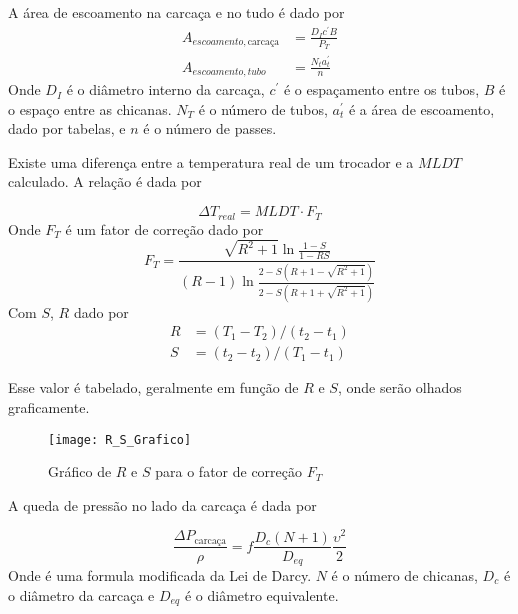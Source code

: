A área de escoamento na carcaça e no tudo é dado por 
\begin{align}
    A_{escoamento, \text{carcaça}} &= \frac{D_{I} c^{\prime} B}{P_{T} }\label{eq:area_escoamento_carcaça}\\
    A_{escoamento, tubo} &= \frac{N_{t} a_t ^{\prime} }{n}\label{eq:area_escoamento_tubo}
\end{align}
Onde \(D_{I}\) é o diâmetro interno da carcaça, \(c^{\prime}\) é o espaçamento entre os tubos,
\(B\) é o espaço entre as chicanas. \(N_{T} \) é o número de tubos, \(a_{t}^{\prime}\) é a área de
escoamento, dado por tabelas, e \(n\) é o número de passes. \par

Existe uma diferença entre a temperatura real de um trocador e a \(MLDT\) calculado. A relação é
dada por

\begin{equation}\label{eq:temp_real_trocador}
    \Delta T_{real} =  MLDT \cdot F_T
\end{equation}
Onde \(F_{T} \) é um fator de correção dado por
\begin{equation}\label{eq:fator_correcao_trocador}
    F_{T} = \frac{\sqrt{R^{2} + 1} \ln \frac{1 - S}{1 - RS}}{\left( R -1 \right) \ln \frac{2 - S\left( R + 1 - \sqrt{R^{2} + 1}  \right) }{2 - S\left( R + 1 + \sqrt{R^{2} + 1}  \right) }}
\end{equation}
Com \(S\), \(R\) dado por
\begin{align}
    R &= (T_1 - T_2)/(t_2 - t_1)\\
    S &= (t_2 - t_2)/(T_1 - t_1)
\end{align} 

Esse valor é tabelado, geralmente em função de \(R\) e \(S\), onde serão olhados graficamente. \par

\begin{figure}[H]
\centering
\texttt{[image: R\_S\_Grafico]}
\caption{Gráfico de \(R\) e \(S\) para o fator de correção \(F_{T}\)}
\label{fig:R_S_Grafico}
\end{figure}

A queda de pressão no lado da carcaça é dada por

\begin{equation}\label{eq:queda_pressao_carcaça}
    \frac{\Delta P_{\text{carcaça}}}{\rho } = f \frac{D_{c} \left( N+1 \right) }{D_{eq} }\frac{\upsilon ^{2} }{2}
\end{equation}
Onde é uma formula modificada da Lei de Darcy. \(N\) é o número de chicanas, \(D_{c}\) é o diâmetro 
da carcaça e \(D_{eq}\) é o diâmetro equivalente. \par

